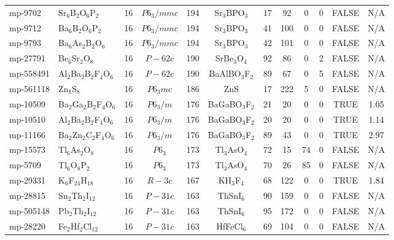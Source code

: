 {\begin{longtable}{llcccccccccc}
    mp-9702 & Sr$_{6}$B$_{2}$O$_{6}$P$_{2}$ & 16    & $P6_3/mmc$ & 194   & Sr$_{3}$BPO$_{3}$ & 17    & 92    & 0     & 0     & FALSE & N/A \\
    mp-9712 & Ba$_{6}$B$_{2}$O$_{6}$P$_{2}$ & 16    & $P6_3/mmc$ & 194   & Sr$_{3}$BPO$_{3}$ & 41    & 100   & 0     & 0     & FALSE & N/A \\
    mp-9793 & Ba$_{6}$As$_{2}$B$_{2}$O$_{6}$ & 16    & $P6_3/mmc$ & 194   & Sr$_{3}$BPO$_{3}$ & 42    & 101   & 0     & 0     & FALSE & N/A \\
    mp-27791 & Be$_{6}$Sr$_{2}$O$_{8}$ & 16    & $P-62c$ & 190   & SrBe$_{3}$O$_{4}$ & 92    & 86    & 0     & 2     & FALSE & N/A \\
    mp-558491 & Al$_{2}$Ba$_{2}$B$_{2}$F$_{4}$O$_{6}$ & 16    & $P-62c$ & 190   & BaAlBO$_{3}$F$_{2}$ & 89    & 67    & 0     & 5     & FALSE & N/A \\
    mp-561118 & Zn$_{8}$S$_{8}$ & 16    & $P6_3mc$ & 186   & ZnS   & 17    & 222   & 5     & 0     & FALSE & N/A \\
    mp-10509 & Ba$_{2}$Ga$_{2}$B$_{2}$F$_{4}$O$_{6}$ & 16    & $P6_3/m$ & 176   & BaGaBO$_{3}$F$_{2}$ & 21    & 20    & 0     & 0     & TRUE  & 1.05  \\
    mp-10510 & Al$_{2}$Ba$_{2}$B$_{2}$F$_{4}$O$_{6}$ & 16    & $P6_3/m$ & 176   & BaGaBO$_{3}$F$_{2}$ & 20    & 20    & 0     & 0     & TRUE  & 1.14  \\
    mp-11166 & Ba$_{2}$Zn$_{2}$C$_{2}$F$_{4}$O$_{6}$ & 16    & $P6_3/m$ & 176   & BaGaBO$_{3}$F$_{2}$ & 89    & 43    & 0     & 0     & TRUE  & 2.97  \\
    mp-15573 & Tl$_{6}$As$_{2}$O$_{8}$ & 16    & $P6_3$ & 173   & Tl$_{3}$AsO$_{4}$ & 72    & 15    & 74    & 0     & FALSE & N/A \\
    mp-5709 & Tl$_{6}$O$_{8}$P$_{2}$ & 16    & $P6_3$ & 173   & Tl$_{3}$AsO$_{4}$ & 70    & 26    & 85    & 0     & FALSE & N/A \\
    mp-29331 & K$_{6}$F$_{24}$H$_{18}$ & 16    & $R-3c$ & 167   & KH$_{3}$F$_{4}$ & 68    & 122   & 0     & 0     & TRUE  & 1.84  \\
    mp-28815 & Sn$_{2}$Th$_{2}$I$_{12}$ & 16    & $P-31c$ & 163   & ThSnI$_{6}$ & 90    & 159   & 0     & 0     & FALSE & N/A \\
    mp-505148 & Pb$_{2}$Th$_{2}$I$_{12}$ & 16    & $P-31c$ & 163   & ThSnI$_{6}$ & 95    & 172   & 0     & 0     & FALSE & N/A \\
    mp-28220 & Fe$_{2}$Hf$_{2}$Cl$_{12}$ & 16    & $P-31c$ & 163   & HfFeCl$_{6}$ & 69    & 104   & 0     & 0     & FALSE & N/A \\

\end{longtable}}
